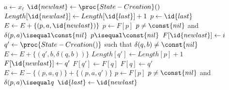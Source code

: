 \documentclass[UTF8]{ctexart}
\theoremstyle{definition}
\theoremstyle{remark}
\numberwithin{equation}{subsection}
\begin{document}
	\begin{codebox}
		\li $a \gets x_{\ell}$
		\li	$\id{newlast} \gets \proc{State-Creation}()$
		\li	$Length[\id{newlast}] \gets Length[\id{last}] + 1$
		\li $p \gets \id{last}$
		\li {}
		\li		\Do
				$E \gets E + \{(p, a, \id{newlast})\}$
		\li		$p \gets F[p]$
				\End
		\li	\While $p \neq \const{nil}$ and $\delta(p,a) \isequal \const{nil}$
		\li \If $p \isequal \const{nil}$
		\li		\Then $F[\id{newlast}] \gets i$
		\li	\Else
				$q' \gets \proc{State-Creation()}$
		\li		\For {} such that $\delta(q, b) \neq \const{nil}$
		\li		\Do 
					$E \gets E + \{(q', b, \delta(q, b))\}$
				\End
		\li		$Length[q'] \gets Length[p] + 1$
		\li		$F[\id{newlast}] \gets q'$
		\li		$F[q'] \gets F[q]$
		\li		$F[q] \gets q'$
		\li		{}
		\li			\Do
						$E \gets E - \{(p, a, q)\} + \{(p, a, q')\}$
		\li				$p \gets F[p]$
					\End
		\li		\While $p \neq \const{nil}$ and $\delta(p, a) \isequal q$
				\End
		\li $\id{last} \gets \id{newlast}$
	\end{codebox}
	
\end{document}
